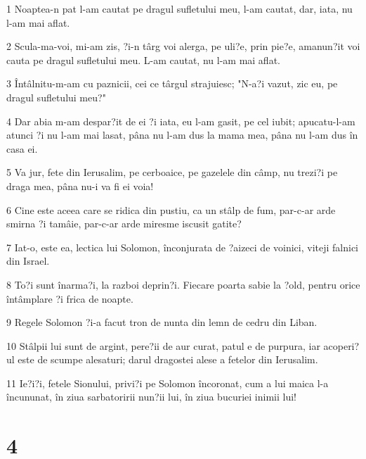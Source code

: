 \par 1 Noaptea-n pat l-am cautat pe dragul sufletului meu, l-am cautat, dar, iata, nu l-am mai aflat.
\par 2 Scula-ma-voi, mi-am zis, ?i-n târg voi alerga, pe uli?e, prin pie?e, amanun?it voi cauta pe dragul sufletului meu. L-am cautat, nu l-am mai aflat.
\par 3 Întâlnitu-m-am cu paznicii, cei ce târgul strajuiesc; "N-a?i vazut, zic eu, pe dragul sufletului meu?"
\par 4 Dar abia m-am despar?it de ei ?i iata, eu l-am gasit, pe cel iubit; apucatu-l-am atunci ?i nu l-am mai lasat, pâna nu l-am dus la mama mea, pâna nu l-am dus în casa ei.
\par 5 Va jur, fete din Ierusalim, pe cerboaice, pe gazelele din câmp, nu trezi?i pe draga mea, pâna nu-i va fi ei voia!
\par 6 Cine este aceea care se ridica din pustiu, ca un stâlp de fum, par-c-ar arde smirna ?i tamâie, par-c-ar arde miresme iscusit gatite?
\par 7 Iat-o, este ea, lectica lui Solomon, înconjurata de ?aizeci de voinici, viteji falnici din Israel.
\par 8 To?i sunt înarma?i, la razboi deprin?i. Fiecare poarta sabie la ?old, pentru orice întâmplare ?i frica de noapte.
\par 9 Regele Solomon ?i-a facut tron de nunta din lemn de cedru din Liban.
\par 10 Stâlpii lui sunt de argint, pere?ii de aur curat, patul e de purpura, iar acoperi?ul este de scumpe alesaturi; darul dragostei alese a fetelor din Ierusalim.
\par 11 Ie?i?i, fetele Sionului, privi?i pe Solomon încoronat, cum a lui maica l-a încununat, în ziua sarbatoririi nun?ii lui, în ziua bucuriei inimii lui!

\chapter{4}

